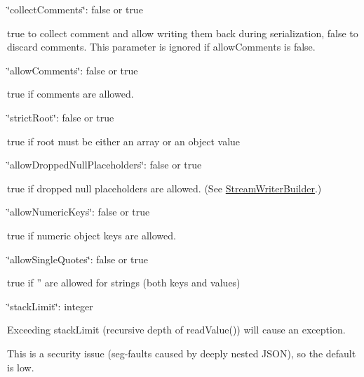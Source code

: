 \begin{DoxyItemize}
\item {\ttfamily \char`\"{}collect\-Comments\char`\"{}\-: false or true}
\begin{DoxyItemize}
\item true to collect comment and allow writing them back during serialization, false to discard comments. This parameter is ignored if allow\-Comments is false.
\end{DoxyItemize}
\item {\ttfamily \char`\"{}allow\-Comments\char`\"{}\-: false or true}
\begin{DoxyItemize}
\item true if comments are allowed.
\end{DoxyItemize}
\item {\ttfamily \char`\"{}strict\-Root\char`\"{}\-: false or true}
\begin{DoxyItemize}
\item true if root must be either an array or an object value
\end{DoxyItemize}
\item {\ttfamily \char`\"{}allow\-Dropped\-Null\-Placeholders\char`\"{}\-: false or true}
\begin{DoxyItemize}
\item true if dropped null placeholders are allowed. (See \hyperlink{class_json_1_1_stream_writer_builder}{Stream\-Writer\-Builder}.)
\end{DoxyItemize}
\item {\ttfamily \char`\"{}allow\-Numeric\-Keys\char`\"{}\-: false or true}
\begin{DoxyItemize}
\item true if numeric object keys are allowed.
\end{DoxyItemize}
\item {\ttfamily \char`\"{}allow\-Single\-Quotes\char`\"{}\-: false or true}
\begin{DoxyItemize}
\item true if '' are allowed for strings (both keys and values)
\end{DoxyItemize}
\item {\ttfamily \char`\"{}stack\-Limit\char`\"{}\-: integer}
\begin{DoxyItemize}
\item Exceeding stack\-Limit (recursive depth of {\ttfamily read\-Value()}) will cause an exception.
\item This is a security issue (seg-\/faults caused by deeply nested J\-S\-O\-N), so the default is low.

\end{DoxyItemize}
\end{DoxyItemize}
